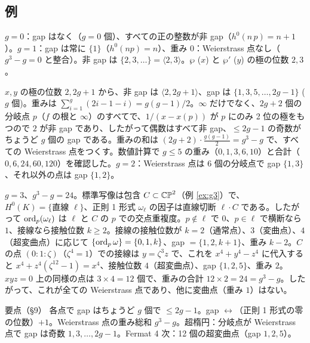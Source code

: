 \subsection{例}
\begin{ex}[$g=0$、$g=1$]
$g=0$：gap はなく（$g=0$ 個）、すべての正の整数が非 gap（$h^0(n\,p)=n+1$）。$g=1$：gap は常に $\{1\}$（$h^0(np)=n$）、重み $0$：Weierstrass 点なし（$g^3-g=0$ と整合）。非 gap は $\{2,3,\dots\}=\langle2,3\rangle$。$\wp$ ($x$) と $\wp'$ ($y$) の極の位数 $2,3$。
\end{ex}
\begin{ex}[超楕円曲線 $y^2=f(x)$、$\deg f=2g+1$、$p=\infty$]\label{ex:hyperweier}
$x,y$ の極の位数 $2,2g+1$ から、非 gap は $\langle2,2g+1\rangle$、gap は $\{1,3,5,\dots,2g-1\}$ ($g$ 個)。重みは $\sum_{i=1}^g(2i-1-i)=g(g-1)/2$。$\infty$ だけでなく、$2g+2$ 個の分岐点 $p$（$f$ の根と $\infty$）のすべてで、$1/(x-x(p))$ が $p$ にのみ 2 位の極をもつので $2$ が非 gap であり、したがって偶数はすべて非 gap、$\le2g-1$ の奇数がちょうど $g$ 個の gap である。重みの和は $(2g+2)\cdot\frac{g(g-1)}2=g^3-g$ で、すべての Weierstrass 点をつくす。数値計算で $g\le5$ の重み（$0,1,3,6,10$）と合計（$0,6,24,60,120$）を確認した。$g=2$：Weierstrass 点は $6$ 個の分岐点で gap $\{1,3\}$、それ以外の点は gap $\{1,2\}$。
\end{ex}
\begin{ex}[Fermat 4 次曲線 $x^4+y^4=z^4$、$g=3$]\label{ex:fermatW}
$g=3$、$g^3-g=24$。標準写像は包含 $C\subset\mathbb{CP}^2$（例 \ref{ex:g3}）で、$H^0(K)=\{\text{直線 }\ell\}$、正則 1 形式 $\omega_\ell$ の因子は直線切断 $\ell\cdot C$ である。したがって $\operatorname{ord}_p(\omega_\ell)$ は $\ell$ と $C$ の $p$ での交点重複度。$p\notin\ell$ で $0$、$p\in\ell$ で横断なら $1$、接線なら接触位数 $k\ge2$。接線の接触位数が $k=2$（通常点）、$3$（変曲点）、$4$（超変曲点）に応じて $\{\operatorname{ord}_p\omega\}=\{0,1,k\}$、gap $=\{1,2,k+1\}$、重み $k-2$。$C$ の点 $(0:1:\zeta)$（$\zeta^4=1$）での接線は $y=\zeta^3z$ で、これを $x^4+y^4-z^4$ に代入すると $x^4+z^4(\zeta^{12}-1)=x^4$、接触位数 $4$（超変曲点）、gap $\{1,2,5\}$、重み $2$。$xyz=0$ 上の同様の点は $3\times4=12$ 個で、重みの合計 $12\times2=24=g^3-g$。したがって、これが全ての Weierstrass 点であり、他に変曲点（重み $1$）はない。
\end{ex}

\begin{keybox}{要点（§9）}
各点で gap はちょうど $g$ 個で $\le2g-1$。gap $\leftrightarrow$（正則 1 形式の零の位数）$+1$。Weierstrass 点の重み総和 $g^3-g$。超楕円：分岐点が Weierstrass 点で gap は奇数 $1,3,\dots,2g-1$。Fermat 4 次：12 個の超変曲点（gap $1,2,5$）。
\end{keybox}

